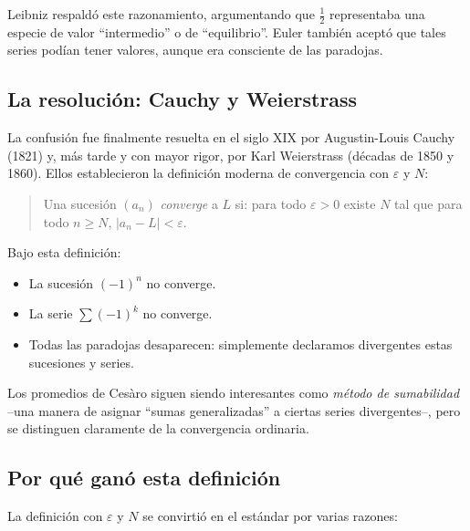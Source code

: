 Leibniz respaldó este razonamiento, argumentando que $\frac12$ representaba una especie de valor ``intermedio'' o de ``equilibrio''. Euler también aceptó que tales series podían tener valores, aunque era consciente de las paradojas.

\subsection{La resolución: Cauchy y Weierstrass}

La confusión fue finalmente resuelta en el siglo XIX por Augustin-Louis Cauchy (1821) y, más tarde y con mayor rigor, por Karl Weierstrass (décadas de 1850 y 1860). Ellos establecieron la definición moderna de convergencia con $\varepsilon$ y $N$:

\begin{quote}
Una sucesión $(a_n)$ \emph{converge} a $L$ si: para todo $\varepsilon > 0$ existe $N$ tal que para todo $n \ge N$, $|a_n - L| < \varepsilon$.
\end{quote}

Bajo esta definición:
\begin{itemize}
  \item La sucesión $(-1)^n$ no converge.
  \item La serie $\sum (-1)^k$ no converge.
  \item Todas las paradojas desaparecen: simplemente declaramos divergentes estas sucesiones y series.
\end{itemize}

Los promedios de Cesàro siguen siendo interesantes como \emph{método de sumabilidad} --una manera de asignar ``sumas generalizadas'' a ciertas series divergentes--, pero se distinguen claramente de la convergencia ordinaria.

\subsection{Por qué ganó esta definición}

La definición con $\varepsilon$ y $N$ se convirtió en el estándar por varias razones:

